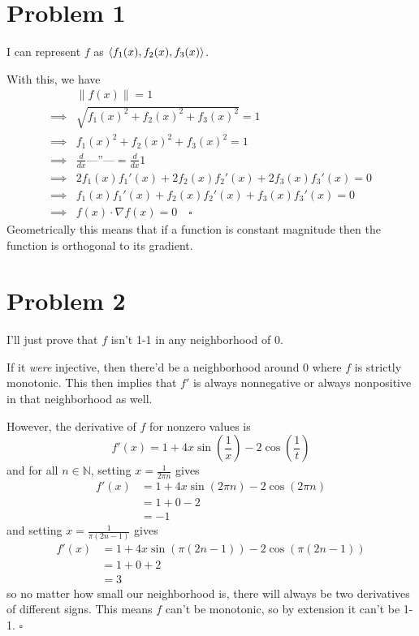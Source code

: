 \documentclass[12pt]{article}
\newcommand{\N}{\mathbb{N}}
\newcommand{\norm}[1]{\left\lVert#1\right\rVert}
\newcommand*{\ditto}{---''---}
\begin{document}
\section{Problem 1}

I can represent $f$ as $\braket{f_1(x), f_2(x), f_3(x)}$.

With this, we have
\begin{align*}
             & \norm{f(x)}=1                                    \\
  \implies{} & \sqrt{f_1(x)^2+f_2(x)^2+f_3(x)^2}=1              \\
  \implies{} & f_1(x)^2+f_2(x)^2+f_3(x)^2=1                     \\
  \implies{} & \frac{d}{dx} \text{\ditto} = \frac{d}{dx} 1      \\
  \implies{} & 2f_1(x)f_1'(x)+2f_2(x)f_2'(x)+2f_3(x)f_3'(x) = 0 \\
  \implies{} & f_1(x)f_1'(x)+f_2(x)f_2'(x)+f_3(x)f_3'(x) = 0    \\
  \implies{} & f(x) \cdot \nabla f(x) = 0\quad\square
\end{align*}
Geometrically this means that if a function is constant magnitude then
the function is orthogonal to its gradient.

\pagebreak

\section{Problem 2}

I'll just prove that $f$ isn't 1-1 in any neighborhood of $0$.

If it \textit{were} injective, then there'd be a neighborhood around $0$ where $f$ is strictly monotonic.
This then implies that $f'$ is always nonnegative or always nonpositive in that neighborhood as well.

However, the derivative of $f$ for nonzero values is
\[f'(x)=1+4x\sin\left(\frac{1}{x}\right)-2\cos\left(\frac{1}{t}\right)\]
and for all $n \in \N$, setting $x=\frac{1}{2\pi n}$ gives
\begin{align*}
  f'(x)
   & =1+4x\sin(2\pi n)-2\cos(2\pi n) \\
   & = 1+0-2                         \\
   & = -1
\end{align*}
and setting $x=\frac{1}{\pi(2n-1)}$ gives
\begin{align*}
  f'(x)
   & =1+4x\sin(\pi(2n-1))-2\cos(\pi(2n-1)) \\
   & = 1+0+2                               \\
   & = 3
\end{align*}
so no matter how small our neighborhood is, there will always be two derivatives of different signs.
This means $f$ can't be monotonic, so by extension it can't be 1-1. $\square$
\end{document}
